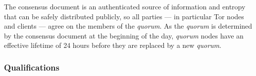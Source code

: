 %
%
%		  
%
%		  
%			
%			
%			
%

The consensus document is an authenticated source of information and entropy that can be safely distributed publicly, so all parties --- in particular Tor nodes and clients --- agree on the members of the \emph{quorum}. As the \emph{quorum} is determined by the consensus document at the beginning of the day, \emph{quorum} nodes have an effective lifetime of 24 hours before they are replaced by a new \emph{quorum}.

\subsubsection{Qualifications}

